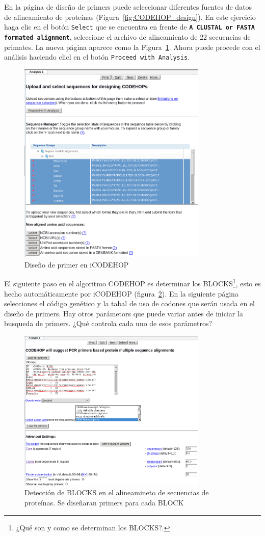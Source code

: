 \documentclass[letter,11pt]{book}
\begin{document}
En la página de diseño de primers puede seleccionar diferentes fuentes de datos de alineamiento de proteínas (Figura~\ref{fig:CODEHOP_design}). En este ejercicio haga clic en el botón \Verb+Select+ que se encuentra en frente de \textbf{\Verb+A CLUSTAL or FASTA formated alignment+}, seleccione el archivo de alineamiento de 22 secuencias de primates. La nueva página aparece como la Figura~\ref{fig:CODEHOP_design2}. Ahora puede procede con el análisis haciendo clicl en el botón \Verb+Proceed with Analysis+.

\begin{figure}[h!]
\centering
 \includegraphics[width=9cm]{Figs/CODEHOP_design2.png}
 \caption{\label{fig:CODEHOP_design2}Diseño de primer en iCODEHOP}
\end{figure}

El siguiente paso en el algoritmo CODEHOP es determinar los BLOCKS\footnote{¿Qué son y como se determinan los BLOCKS?.}, esto es hecho automáticamente por iCODEHOP (figura~\ref{fig:CODEHOP_design3}). En la siguiente página selecciones el código genético y la tabal de uso de codones que serán usada en el diseño de primers. Hay otros parámetors que puede variar antes de iniciar la busqueda de primers. ¿Qué controla cada uno de esos parámetros?

\begin{figure}[h!]
\centering
 \includegraphics[width=9cm]{Figs/CODEHOP_design3.png}
 \caption{\label{fig:CODEHOP_design3}Detección de BLOCKS en el alineamineto de secuencias de proteínas. Se diseñaran primers para cada BLOCK}
\end{figure}
\end{document}
